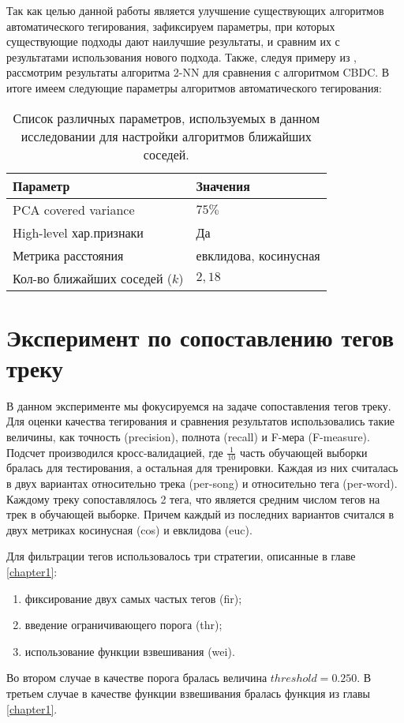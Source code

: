 Так как целью данной работы является улучшение существующих алгоритмов автоматического тегирования, зафиксируем параметры, при которых существующие подходы дают наилучшие результаты, 
и сравним их с результатами использования нового подхода. Также, следуя примеру из \cite{msordo_thesis}, рассмотрим результаты алгоритма 2-NN для сравнения с алгоритмом CBDC.
В итоге имеем следующие параметры алгоритмов автоматического тегирования:
\begin{table}[ht]
\centering
\captionsetup{justification=centering}
\caption{Список различных параметров, используемых в данном исследовании для настройки алгоритмов ближайших соседей.}
\label{tab:new_algo_settings}
\begin{tabular}{ p{5cm}  p{4cm} }
  \hline    
  Параметр & Значения \\
  \hline    
  PCA covered variance & $75\%$ \\
  High-level хар.признаки & Да \\
  Метрика расстояния & евклидова, косинусная \\
  Кол-во ближайших соседей ($k$) & $2, 18$ \\
  \hline    
\end{tabular}
\end{table}

\section{Эксперимент по сопоставлению тегов треку}

В данном эксперименте мы фокусируемся на задаче сопоставления тегов треку. Для оценки качества тегирования и сравнения результатов использовались такие величины, как
точность (precision), полнота (recall) и F-мера (F-measure). Подсчет производился кросс-валидацией, где $\frac{1}{10}$ часть обучающей выборки бралась для тестирования, а остальная \ld для тренировки.
Каждая из них считалась в двух вариантах \ld относительно трека (per-song) и относительно тега (per-word).
Каждому треку сопоставлялось 2 тега, что является средним числом тегов на трек в обучающей выборке. Причем каждый из последних вариантов считался в двух метриках \ld косинусная (cos) и евклидова (euc).

Для фильтрации тегов использовалось три стратегии, описанные в главе \ref{chapter1}:
\begin{enumerate}
 \item фиксирование двух самых частых тегов (fir);
 \item введение ограничивающего порога (thr);
 \item использование функции взвешивания (wei).
\end{enumerate}
Во втором случае в качестве порога бралась величина $threshold = 0.250$. В третьем случае в качестве функции взвешивания бралась функция из главы \ref{chapter1}.


